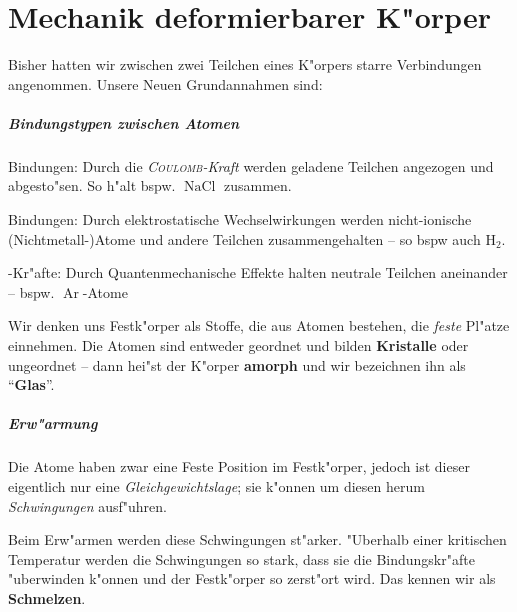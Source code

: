 \chapter{Mechanik deformierbarer K"orper}
\label{kap_mechanik-deformierbarer-korper}




Bisher hatten wir zwischen zwei Teilchen eines K"orpers starre
Verbindungen angenommen. Unsere Neuen Grundannahmen sind:

\paragraph{Bindungstypen zwischen Atomen}
\label{kap_bindungstypen-zwischen-atomen}

\begin{description}[\setlabelstyle{\bfseries\slshape}]
\item[\index{Ionische Bindung}Ionische] Bindungen: Durch die
   \emph{\textsc{Coulomb}-Kraft} werden geladene Teilchen angezogen
   und abgesto"sen. So h"alt bspw. $\operatorname{NaCl}$ zusammen.
\item[\index{kovalente Bindung}kovalente] Bindungen: Durch
   elektrostatische Wechselwirkungen werden nicht-ionische
   (Nichtmetall-)Atome und andere Teilchen zusammengehalten -- so bspw
   auch $\operatorname{H_2}$.
\item[\textsc{\index{Van-der-Waals-Kr"afte}Van-Der-Waals}]-Kr"afte:
   Durch Quantenmechanische Effekte halten neutrale Teilchen
   aneinander -- bspw. $\operatorname{Ar}$-Atome
\end{description}
Wir denken uns Festk"orper als Stoffe, die aus Atomen bestehen, die
\emph{feste} Pl"atze einnehmen. Die Atomen sind entweder geordnet und
bilden \textbf{Kristalle} oder ungeordnet -- dann
hei"st der K"orper \textbf{amorph} und wir bezeichnen
ihn als "`\textbf{Glas}"'.


\paragraph{Erw"armung}
\label{kap_erwarmung}

Die Atome haben zwar eine Feste Position im Festk"orper, jedoch ist
dieser eigentlich nur eine \emph{Gleichgewichtslage}; sie k"onnen um
diesen herum \emph{Schwingungen} ausf"uhren.

Beim Erw"armen werden diese Schwingungen st"arker. "Uberhalb einer
kritischen Temperatur werden die Schwingungen so stark, dass sie die
Bindungskr"afte "uberwinden k"onnen und der Festk"orper so zerst"ort
wird. Das kennen wir als \textbf{Schmelzen}.


